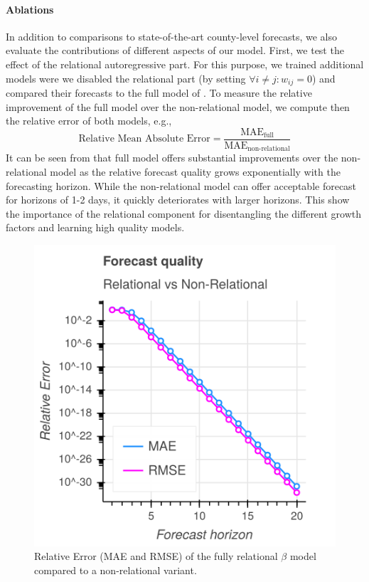 \documentclass{article}
\newcommand{\bAR}{\ensuremath{\beta}\text{-AR}\xspace}
\begin{document}
\paragraph{Ablations} In addition to comparisons to state-of-the-art
county-level forecasts, we also evaluate the contributions of different aspects
of our model. First, we test the effect of the relational autoregressive part.
For this purpose, we trained additional models were we disabled the relational
part (by setting \(\forall i \neq j: w_{ij} = 0\)) and compared their forecasts to
the full model of . To measure the relative improvement of the
full model over the non-relational model, we compute then the relative error of
both models, e.g.,
\begin{equation*}
    \text{Relative Mean Absolute Error} = \frac{\text{MAE}_{\text{full}}}{\text{MAE}_\text{non-relational}}
\end{equation*}
It can be seen from  that full model offers substantial
improvements over the non-relational model as the relative forecast quality
grows exponentially with the forecasting horizon. While the non-relational model
can offer acceptable forecast for horizons of 1-2 days, it quickly deteriorates
with larger horizons. This show the importance of the relational component for
disentangling the different growth factors and learning high quality models.

\begin{figure}[tb]
\centering
\includegraphics[width=.7\linewidth]{img/quality_ratio.png}
\caption{\label{fig:quality-ratio}Relative Error (MAE and RMSE) of the fully relational \bAR model compared to a non-relational variant.}
\end{figure}
\end{document}
